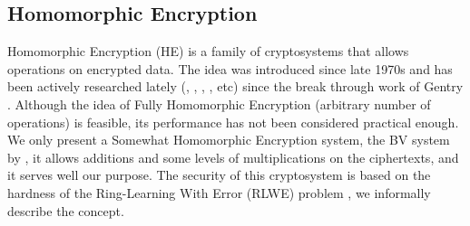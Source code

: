 \subsection{Homomorphic Encryption}
Homomorphic Encryption (HE) is a family of cryptosystems that allows operations
on encrypted data. The idea was introduced since late 1970s
\cite{rivest1978data} and has been actively researched lately
(\cite{smart2014fully}, \cite{van2010fully}, \cite{EPRINT:SteSte10},
\cite{gentry2013homomorphic}, etc) since the break through work of Gentry
\cite{homenc}.  Although the idea of Fully Homomorphic Encryption (arbitrary
number of operations) is feasible, its performance has not been considered
practical enough. We only present a Somewhat Homomorphic Encryption system, the
BV system by \cite{brakerski2011fully}, it allows additions and some levels of
multiplications on the ciphertexts, and it serves well our purpose. The security
of this cryptosystem is based on the hardness of the Ring-Learning With Error
(RLWE) problem \cite{lyubashevsky2010ideal}, we informally describe the concept.
